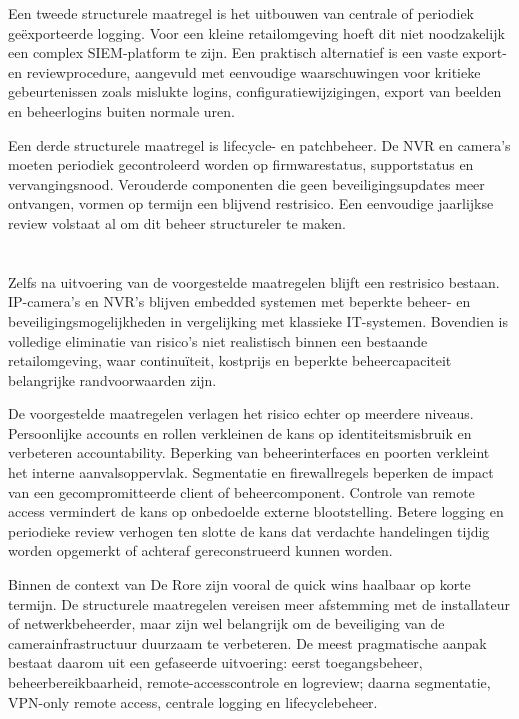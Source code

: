 Een tweede structurele maatregel is het uitbouwen van centrale of periodiek geëxporteerde logging. Voor een kleine retailomgeving hoeft dit niet noodzakelijk een complex SIEM-platform te zijn. Een praktisch alternatief is een vaste export- en reviewprocedure, aangevuld met eenvoudige waarschuwingen voor kritieke gebeurtenissen zoals mislukte logins, configuratiewijzigingen, export van beelden en beheerlogins buiten normale uren.

Een derde structurele maatregel is lifecycle- en patchbeheer. De NVR en camera's moeten periodiek gecontroleerd worden op firmwarestatus, supportstatus en vervangingsnood. Verouderde componenten die geen beveiligingsupdates meer ontvangen, vormen op termijn een blijvend restrisico. Een eenvoudige jaarlijkse review volstaat al om dit beheer structureler te maken.

\section{}%
\label{sec:restrisico}

Zelfs na uitvoering van de voorgestelde maatregelen blijft een restrisico bestaan. IP-camera's en NVR's blijven embedded systemen met beperkte beheer- en beveiligingsmogelijkheden in vergelijking met klassieke IT-systemen. Bovendien is volledige eliminatie van risico's niet realistisch binnen een bestaande retailomgeving, waar continuïteit, kostprijs en beperkte beheercapaciteit belangrijke randvoorwaarden zijn.

De voorgestelde maatregelen verlagen het risico echter op meerdere niveaus. Persoonlijke accounts en rollen verkleinen de kans op identiteitsmisbruik en verbeteren accountability. Beperking van beheerinterfaces en poorten verkleint het interne aanvalsoppervlak. Segmentatie en firewallregels beperken de impact van een gecompromitteerde client of beheercomponent. Controle van remote access vermindert de kans op onbedoelde externe blootstelling. Betere logging en periodieke review verhogen ten slotte de kans dat verdachte handelingen tijdig worden opgemerkt of achteraf gereconstrueerd kunnen worden.

Binnen de context van De Rore zijn vooral de quick wins haalbaar op korte termijn. De structurele maatregelen vereisen meer afstemming met de installateur of netwerkbeheerder, maar zijn wel belangrijk om de beveiliging van de camerainfrastructuur duurzaam te verbeteren. De meest pragmatische aanpak bestaat daarom uit een gefaseerde uitvoering: eerst toegangsbeheer, beheerbereikbaarheid, remote-accesscontrole en logreview; daarna segmentatie, VPN-only remote access, centrale logging en lifecyclebeheer.

